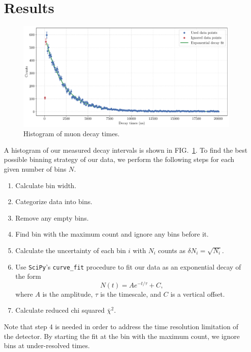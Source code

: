 \documentclass{../paper}
\begin{document}
\section{Results} \label{sec:results}

\begin{figure}
  \centering
  \includegraphics[width=\textwidth]{data/analysis.pdf}
  \caption{Histogram of muon decay times.}
  \label{fig:analysis}
\end{figure}

A histogram of our measured decay intervals is shown in FIG.~\ref{fig:analysis}. To find the best possible binning strategy of our data, we perform the following steps for each given number of bins $N$.
\begin{enumerate}
  \item Calculate bin width.
  \item Categorize data into bins.
  \item Remove any empty bins.
  \item Find bin with the maximum count and ignore any bins before it.
  \item Calculate the uncertainty of each bin $i$ with $N_i$ counts as $\delta N_i = \sqrt{N_i}$.
  \item Use {\tt SciPy}'s {\tt curve\_fit} procedure \cite{SciPy} to fit our data as an exponential decay of the form
    \begin{equation}
      N(t) = A e^{-t/\tau} + C,
    \end{equation}
    where $A$ is the amplitude, $\tau$ is the timescale, and $C$ is a vertical offset.
  \item Calculate reduced chi squared $\bar\chi^2$.
\end{enumerate}

Note that step 4 is needed in order to address the time resolution limitation of the detector. By starting the fit at the bin with the maximum count, we ignore bins at under-resolved times.
\end{document}
